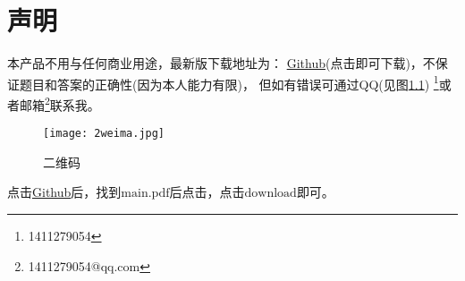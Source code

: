 \chapter{声明}
本产品不用与任何商业用途，最新版下载地址为：
\href{https://github.com/1411279054/Letax-learning-Note/tree/master/%E6%95%B0%E5%AD%A6%E5%88%86%E6%9E%90%E8%A7%A3%E9%A2%98%E6%8C%87%E5%8D%97%E8%AF%BE%E5%90%8E%E4%B9%A0%E9%A2%98%E9%87%8D%E6%8E%92}{Github}(点击即可下载)，不保证题目和答案的正确性(因为本人能力有限)，
但如有错误可通过QQ(见图\ref{fig:1}) \footnote{1411279054}或者邮箱\footnote{1411279054@qq.com}联系我。
\begin{figure}[htbp]
	\centering
	\texttt{[image: 2weima.jpg]}
	\caption{二维码}\label{fig:1}
\end{figure}

点击\href{https://github.com/1411279054/Letax-learning-Note/tree/master/%E6%95%B0%E5%AD%A6%E5%88%86%E6%9E%90%E8%A7%A3%E9%A2%98%E6%8C%87%E5%8D%97%E8%AF%BE%E5%90%8E%E4%B9%A0%E9%A2%98%E9%87%8D%E6%8E%92}{Github}后，找到$\mathrm{main.pdf}$后点击，点击$\mathrm{download}$即可。